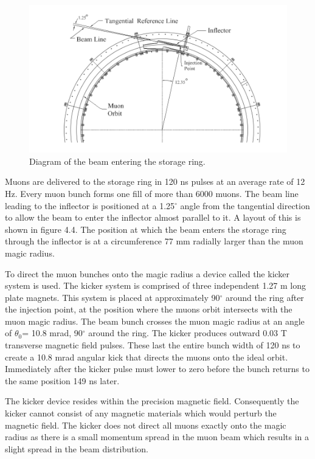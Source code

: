 \begin{figure}[th]
\centering
\includegraphics[scale=0.9]{Figures/injectionbeamline}
\decoRule
\caption{Diagram of the beam entering the storage ring.}
\label{fig:injectionbeamline}
\end{figure}

Muons are delivered to the storage ring in 120 ns pulses at an average rate of 12 Hz. Every muon bunch forms one fill of more than 6000 muons. The beam line leading to the inflector is positioned at a 1.25$^{\circ}$ angle from the tangential direction to allow the beam to enter the inflector almost parallel to it. A layout of this is shown in figure 4.4. The position at which the beam enters the storage ring through the inflector is at a circumference 77 mm radially larger than the muon magic radius. 

To direct the muon bunches onto the magic radius a device called the kicker system is used. The kicker system is comprised of three independent 1.27 m long plate magnets. This system is placed at approximately 90$^{\circ}$ around the ring after the injection point, at the position where the muons orbit intersects with the muon magic radius. The beam bunch crosses the muon magic radius at an angle of $\theta_{0}$= 10.8 mrad, 90$^{\circ}$ around the ring. The kicker produces outward 0.03 T transverse magnetic field pulses. These last the entire bunch width of 120 ns to create a 10.8 mrad angular kick that directs the muons onto the ideal orbit. Immediately after the kicker pulse must lower to zero before the bunch returns to the same position 149 ns later.

The kicker device resides within the precision magnetic field. Consequently the kicker cannot consist of any magnetic materials which would perturb the magnetic field. The kicker does not direct all muons exactly onto the magic radius as there is a small momentum spread in the muon beam which results in a slight spread in the beam distribution.

